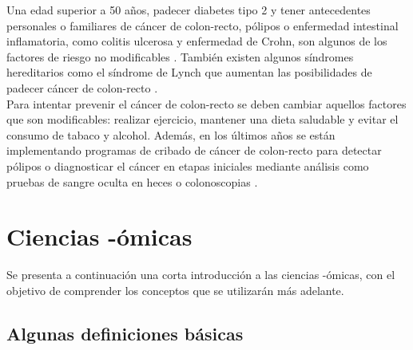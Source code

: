 Una edad superior a 50 años, padecer diabetes tipo 2 y tener antecedentes personales o familiares de cáncer de colon-recto, pólipos o enfermedad intestinal inflamatoria, como colitis ulcerosa y enfermedad de Crohn, son algunos de los factores de riesgo no modificables \cite{AmericanCancerSociety2020}. También existen algunos síndromes hereditarios como el síndrome de Lynch que aumentan las posibilidades de padecer cáncer de colon-recto \cite{Lynch2003}.\\

Para intentar prevenir el cáncer de colon-recto se deben cambiar aquellos factores que son modificables: realizar ejercicio, mantener una dieta saludable y evitar el consumo de tabaco y alcohol. Además, en los últimos años se están implementando programas de cribado de cáncer de colon-recto para detectar pólipos o diagnosticar el cáncer en etapas iniciales mediante análisis como pruebas de sangre oculta en heces o colonoscopias \cite{Levin2008}.\\


\section{Ciencias -ómicas}

Se presenta a continuación una corta introducción a las ciencias -ómicas, con el objetivo de comprender los conceptos que se utilizarán más adelante.

\subsection{Algunas definiciones básicas}

